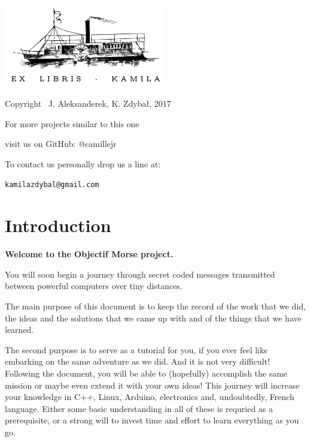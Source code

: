\documentclass[12pt]{report}
\begin{document}
\thispagestyle{empty}
\begin{center}
    
\vspace*{4cm}

\includegraphics[width = 70mm]{ex_libris.png}

\vspace*{2cm}

Copyright \textcopyright \, J. Aleksanderek, K. Zdybał, 2017

For more projects similar to this one

visit us on GitHub: @camillejr

To contact us personally drop us a line at:

\verb|kamilazdybal@gmail.com|

\end{center}
\newpage




\setlength{\parindent}{0cm}
\clearpage

\tableofcontents

\setlength{\parskip}{1em}
\renewcommand{\baselinestretch}{1.0}

\chapter{Introduction}\label{chap:intro}

\textbf{Welcome to the Objectif Morse project.} 

You will soon begin a journey through secret coded messages transmitted between powerful computers over tiny distances.

The main purpose of this document is to keep the record of the work that we did, the ideas and the solutions that we came up with and of the things that we have learned.

The second purpose is to serve as a tutorial for you, if you ever feel like embarking on the same adventure as we did. And it is not very difficult! Following the document, you will be able to (hopefully) accomplish the same mission or maybe even extend it with your own ideas! This journey will increase your knowledge in C++, Linux, Arduino, electronics and, undoubtedly, French language. Either some basic understanding in all of these is requried as a prerequisite, or a strong will to invest time and effort to learn everything as you go.
\end{document}
